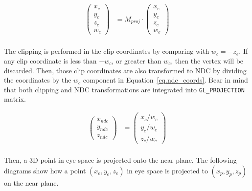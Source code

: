 \begin{equation}
\begin{aligned}
\begin{pmatrix} x_{c}\\y_{c}\\z_{c}\\w_{c} \end{pmatrix} &= 
M_{proj} \cdot \begin{pmatrix} x_{e}\\y_{e}\\z_{e}\\w_{e} \end{pmatrix}\\
\end{aligned}
\label{eq.clip}
\end{equation}

The clipping is performed in the clip coordinates by comparing with $w_c = -z_e$. If any clip coordinate is less than $-w_c$, or greater than $w_c$, then the vertex will be discarded. Then, those clip coordinates are also transformed to NDC by dividing the coordinates by the $w_c$ component in Equation~\ref{eq.ndc_coords}.
Bear in mind that both clipping and NDC transformations are integrated into \verb|GL_PROJECTION| matrix.

\begin{equation}
\begin{aligned}
\begin{pmatrix} x_{ndc}\\y_{ndc}\\z_{ndc}\end{pmatrix} &=
\begin{pmatrix} x_{c}/w_{c}\\y_{c}/w_{c}\\z_{c}/w_{c} \end{pmatrix}\\
\end{aligned}
\label{eq.ndc_coords}
\end{equation}

Then, a 3D point in eye space is projected onto the near plane. The following diagrams show how a point $(x_e, y_e, z_e)$ in eye space is projected to $(x_p, y_p, z_p)$ on the near plane.

